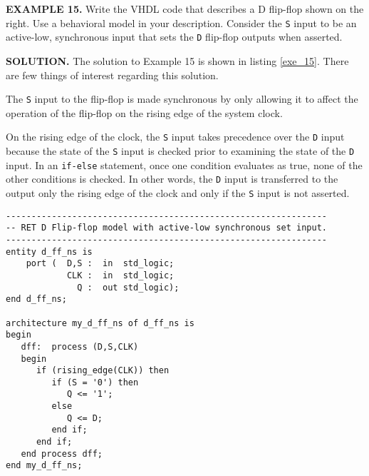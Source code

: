 \begin{leftbar}
\begin{minipage}{0.5\linewidth}
\noindent
\textbf{EXAMPLE 15.}
Write the VHDL code that describes a D flip-flop shown on the right. Use a behavioral model in your description. Consider the \texttt{S} input to be an active-low, synchronous input that sets the \texttt{D} flip-flop outputs when asserted.
\end{minipage}
\begin{minipage}{0.47\linewidth}
\begin{flushright}
\end{flushright}
\end{minipage}
\end{leftbar}
\noindent
\textbf{SOLUTION.} The solution to Example 15 is shown in listing \ref{exe_15}. There are few things of interest regarding this solution.
\begin{my_list}
\item The \texttt{S} input to the flip-flop is made synchronous by only allowing it to affect the operation of the flip-flop on the rising edge of the system clock. 
\item On the rising edge of the clock, the \texttt{S} input takes precedence over the \texttt{D} input because the state of the \texttt{S} input is checked prior to examining the state of the \texttt{D} input. In an \texttt{if-else} statement, once one condition evaluates as true, none of the other conditions is checked. In other words, the \texttt{D} input is transferred to the output only the rising edge of the clock and only if the \texttt{S} input is not asserted.
\end{my_list}
\begin{lstlisting}[label=exe_15, caption=Solution to Example 15.]
---------------------------------------------------------------
-- RET D Flip-flop model with active-low synchronous set input.
---------------------------------------------------------------
entity d_ff_ns is 
    port (  D,S :  in  std_logic; 
            CLK :  in  std_logic; 
              Q :  out std_logic); 
end d_ff_ns;

architecture my_d_ff_ns of d_ff_ns is 
begin
   dff:  process (D,S,CLK)
   begin
      if (rising_edge(CLK)) then
         if (S = '0') then
            Q <= '1';
         else
            Q <= D;
         end if;
      end if;
   end process dff;
end my_d_ff_ns;
\end{lstlisting}

